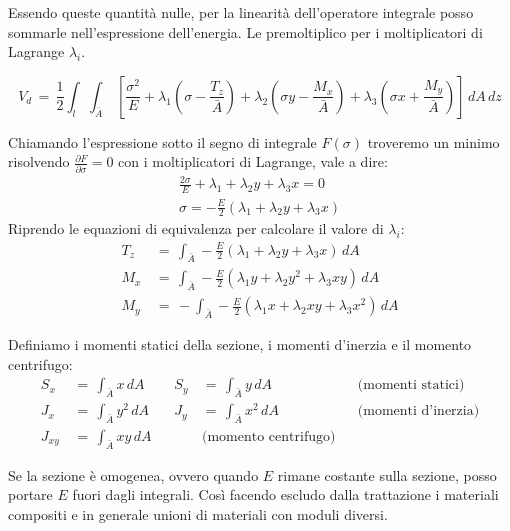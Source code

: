 Essendo queste quantità nulle, per la linearità dell'operatore integrale posso sommarle nell'espressione dell'energia. Le premoltiplico per i moltiplicatori di Lagrange $\lambda_i$. 

\begin{equation*}
    V_d  \,=\, \frac{1}{2} \int_l  \int_{\bar{A}} \, \left[ \frac{\sigma^2}{E}
   + \lambda_1 \left(\sigma-\frac{T_z}{\bar{A}}\right)
   + \lambda_2 \left(\sigma y - \frac{M_x}{\bar{A}}\right)
   + \lambda_3 \left(\sigma x + \frac{M_y}{\bar{A}}\right)
    \right]  \,dA\,dz
\end{equation*}


Chiamando l'espressione sotto il segno di integrale $F(\sigma)$ troveremo un minimo risolvendo $\frac{\partial F}{\partial \sigma} = 0$ con i moltiplicatori di Lagrange, vale a dire:
\begin{align*}
    \frac{2\sigma}{E}+\lambda_1+\lambda_2 y+\lambda_3 x = 0\\
    \sigma = -\frac{E}{2} \left( \lambda_1+\lambda_2 y+\lambda_3 x\right)
\end{align*}
Riprendo le equazioni di equivalenza per calcolare il valore di $\lambda_i$:
\begin{align*}
     T_z \, &=\, \int_{\bar{A}} -\frac{E}{2}  \left( \lambda_1+\lambda_2 y+\lambda_3 x\right) \, dA \\
     M_x \, &=\,  \int_{\bar{A}} -\frac{E}{2}  \left( \lambda_1 y+\lambda_2 y^2+\lambda_3 xy\right)  \, dA\\
     M_y \, &=\, - \int_{\bar{A}} -\frac{E}{2}  \left( \lambda_1 x+\lambda_2 xy+\lambda_3 x^2\right)  \, dA
\end{align*}

Definiamo i momenti statici della sezione, i momenti d'inerzia e il momento centrifugo:
\begin{align*}
    S_x \, &=\, \int_{\bar{A}} x \, dA \quad & S_y \, &=\, \int_{\bar{A}} y \, dA &&\text{(momenti statici)}\\
    J_x \, &=\, \int_{\bar{A}} y^2 \, dA \quad & J_y \, &=\, \int_{\bar{A}} x^2 \, dA &&\text{(momenti d’inerzia)}\\
    J_{xy} \, &=\, \int_{\bar{A}} xy \, dA &&\text{(momento centrifugo)}
\end{align*}

Se la sezione è omogenea, ovvero quando $E$ rimane costante sulla sezione, posso portare $E$ fuori dagli integrali. Così facendo escludo dalla trattazione i materiali compositi e in generale unioni di materiali con moduli diversi.

